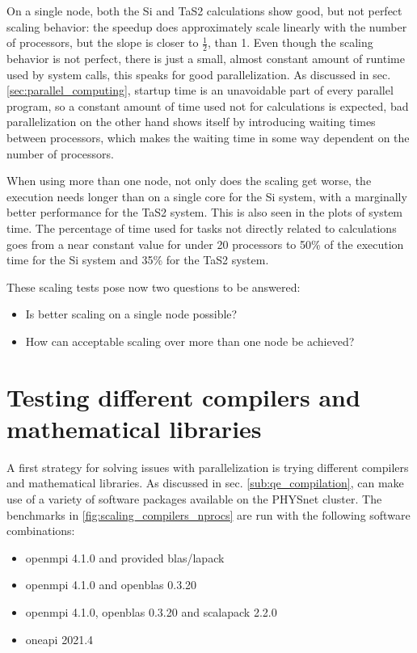 \documentclass[main.tex]{subfiles}
\begin{document}
On a single node, both the Si and TaS2 calculations show good, but not perfect scaling behavior: the speedup does approximately scale linearly with the number of processors, but the slope is closer to \(\frac{1}{2}\), than 1.
Even though the scaling behavior is not perfect, there is just a small, almost constant amount of runtime used by system calls, this speaks for good parallelization.
As discussed in sec. \ref{sec:parallel_computing}, startup time is an unavoidable part of every parallel program, so a constant amount of time used not for calculations is expected, bad parallelization on the other hand shows itself by introducing waiting times between processors, which makes the waiting time in some way dependent on the number of processors.

When using more than one node, not only does the scaling get worse, the execution needs longer than on a single core for the Si system, with a marginally better performance for the TaS2 system.
This is also seen in the plots of system time. The percentage of time used for tasks not directly related to calculations goes from a near constant value for under 20 processors to 50\% of the execution time for the Si system and 35\% for the TaS2 system.

These scaling tests pose now two questions to be answered:
\begin{itemize}
    \item Is better scaling on a single node possible?
    \item How can acceptable scaling over more than one node be achieved?
\end{itemize}

\section{Testing different compilers and mathematical libraries}

A first strategy for solving issues with parallelization is trying different compilers and mathematical libraries.
As discussed in sec. \ref{sub:qe_compilation}, \QE can make use of a variety of software packages available on the PHYSnet cluster.
The benchmarks in \ref{fig:scaling_compilers_nprocs} are run with the following software combinations:
\begin{itemize}
    \item \gls{openmpi} 4.1.0 and \QE provided \gls{blas}/\gls{lapack}
    \item \gls{openmpi} 4.1.0 and \gls{openblas} 0.3.20
    \item \gls{openmpi} 4.1.0, \gls{openblas} 0.3.20 and \gls{scalapack} 2.2.0
    \item \gls{oneapi} 2021.4
\end{itemize}
\end{document}
